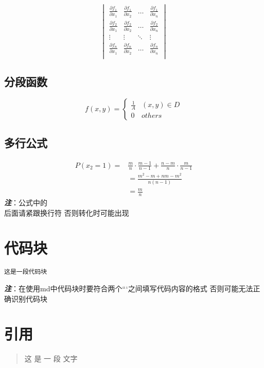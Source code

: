\documentclass[UTF-8]{article}
\begin{document}
$$
\begin{vmatrix}
\frac{\partial f_1}{\partial x_1} & \frac{\partial f_1}{\partial x_2} & \ldots & \frac{\partial f_1}{\partial x_n} \\
\frac{\partial f_2}{\partial x_1} & \frac{\partial f_2}{\partial x_2} & \ldots & \frac{\partial f_2}{\partial x_n} \\
\vdots & \vdots & \ddots & \vdots \\
\frac{\partial f_n}{\partial x_1} & \frac{\partial f_n}{\partial x_2} & \ldots & \frac{\partial f_n}{\partial x_n} \\
\end{vmatrix}
$$

\subsection{分段函数}

$$
f(x,y)=\begin{cases}
        \frac{1}{A}&(x,y)\in D \\
        0&others
     \end{cases}
$$

\subsection{多行公式}

$$
\begin{aligned}
  P(x_2=1)=&\frac{m}{n}\cdot \frac{m-1}{n-1}+\frac{n-m}{n}\cdot \frac{m}{n-1}\\
  &=\frac{m^2-m+nm-m^2}{n(n-1)}\\
  &=\frac{m}{n}
\end{aligned}
$$
\textbf{\textit{注}}：公式中的\\后面请紧跟换行符\n
否则转化时可能出现

\section{代码块}
\begin{lstlisting}[语言]
这是一段代码块

\end{lstlisting}

\textbf{\textit{注}}：在使用md中代码块时要符合两个```之间填写代码内容的格式
否则可能无法正确识别代码块

\section{引用}

\begin{quote}

  这
  是
  一
  段
  文字
\end{quote}
\end{document}
